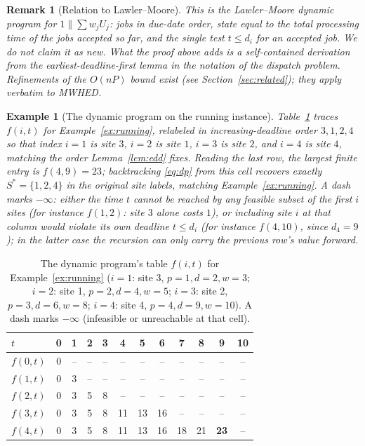 \documentclass[pdflatex,sn-mathphys-ay]{sn-jnl}
\theoremstyle{thmstyleone}
\theoremstyle{thmstyletwo}
\newtheorem{remark}{Remark}
\theoremstyle{thmstylethree}
\newtheorem{example}{Example}
\begin{document}
\begin{remark}[Relation to Lawler--Moore]\label{rem:lawlermoore}
This is the Lawler--Moore dynamic program \citep{lawlermoore1969} for
$1\|\sum w_jU_j$: jobs in due-date order, state equal to the total
processing time of the jobs accepted so far, and the single test
$t\le d_i$ for an accepted job. We do not claim it as new. What the
proof above adds is a self-contained derivation from the
earliest-deadline-first lemma in the notation of the dispatch problem.
Refinements of the $O(nP)$ bound exist (see
Section~\ref{sec:related}); they apply verbatim to MWHED.
\end{remark}

\begin{example}[The dynamic program on the running instance]\label{ex:dp}
Table~\ref{tab:dpwalkthrough} traces $f(i,t)$ for
Example~\ref{ex:running}, relabeled in increasing-deadline order
$3,1,2,4$ so that index $i=1$ is site $3$, $i=2$ is site $1$, $i=3$ is
site $2$, and $i=4$ is site $4$, matching the order Lemma~\ref{lem:edd}
fixes. Reading the last row, the largest finite entry is $f(4,9)=23$;
backtracking \eqref{eq:dp} from this cell recovers exactly $S^\ast =
\{1,2,4\}$ in the original site labels, matching
Example~\ref{ex:running}. A dash marks $-\infty$: either the time $t$ cannot be reached by any
feasible subset of the first $i$ sites (for instance $f(1,2)$: site $3$
alone costs $1$), or including site $i$ at that column would violate its
own deadline $t\le d_i$ (for instance $f(4,10)$, since $d_4=9$); in the
latter case the recursion can only carry the previous row's value
forward.
\end{example}

\begin{table}[h]
\caption{The dynamic program's table $f(i,t)$ for
Example~\ref{ex:running} ($i=1$: site 3, $p=1,d=2,w=3$; $i=2$: site 1,
$p=2,d=4,w=5$; $i=3$: site 2, $p=3,d=6,w=8$; $i=4$: site 4, $p=4,d=9,
w=10$). A dash marks $-\infty$ (infeasible or unreachable at that
cell).}\label{tab:dpwalkthrough}
\begin{tabular}{@{}lccccccccccc@{}}
\toprule
$t$ & 0 & 1 & 2 & 3 & 4 & 5 & 6 & 7 & 8 & 9 & 10\\
\midrule
$f(0,t)$ & 0 & -- & -- & -- & -- & -- & -- & -- & -- & -- & --\\
$f(1,t)$ & 0 & 3 & -- & -- & -- & -- & -- & -- & -- & -- & --\\
$f(2,t)$ & 0 & 3 & 5 & 8 & -- & -- & -- & -- & -- & -- & --\\
$f(3,t)$ & 0 & 3 & 5 & 8 & 11 & 13 & 16 & -- & -- & -- & --\\
$f(4,t)$ & 0 & 3 & 5 & 8 & 11 & 13 & 16 & 18 & 21 & \textbf{23} & --\\
\bottomrule
\end{tabular}
\end{table}
\end{document}
